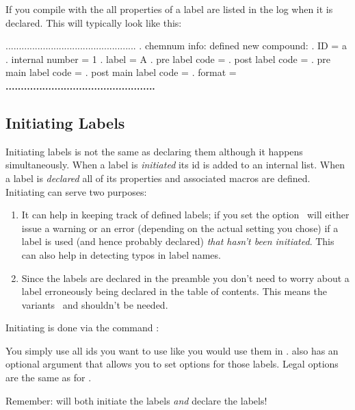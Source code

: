 \documentclass[load-preamble+,babel-options={ngerman,british,american}]{cnltx-doc}
\begin{document}
If you compile with the  all properties of a label are
listed in the log when it is declared.  This will typically look like this:

\begin{sourcecode}
  .................................................
  . chemnum info: defined new compound:
  .   ID = a
  .   internal number = 1
  .   label = A
  .   pre label code = 
  .   post label code = 
  .   pre main label code = 
  .   post main label code = 
  .   format = \bfseries 
  .................................................
\end{sourcecode}

\subsection{Initiating Labels}\label{sec:initiating-labels}
Initiating labels is not the same as declaring them although it happens
simultaneously.  When a label is \emph{initiated} its \ac{id} is added to an
internal list.  When a label is \emph{declared} all of its properties and
associated macros are defined.  Initiating can serve two purposes:
\begin{enumerate}
  \item It can help in keeping track of defined labels; if you set the option
     \chemnum\ will either issue a warning or an error (depending 
    on the actual setting you chose) if a label is used (and hence probably
    declared) \emph{that hasn't been initiated}.  This can also help in
    detecting typos in label names.
  \item Since the labels are declared in the preamble you don't need to worry
    about a label erroneously being declared in the table of contents.  This
    means the variants \sarg\ and \code{+} shouldn't be
    needed.
\end{enumerate}

Initiating is done via the command :
\begin{sourcecode}
\end{sourcecode}
You simply use all \acp{id} you want to use like you would use them in
.   also has an optional argument that allows you to set
options for those labels.  Legal options are the same as for .

Remember:  will both initiate the labels \emph{and} declare the
labels!
\end{document}
